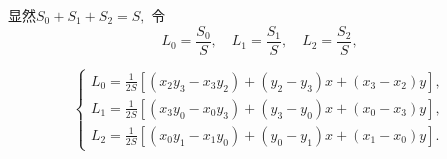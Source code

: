 \documentclass[a4paper,UTF8,titlepage,10pt]{ctexart}
\numberwithin{equation}{subsection}
\begin{document}

\begin{figure}[h]
	\centering
	\caption{}
	\label{xxy}
\end{figure}

显然$S_0 + S_1 + S_2 = S,$ 令
\begin{equation}
L_0 = \frac{S_0}{S}, \quad L_1 = \frac{S_1}{S}, \quad L_2 = \frac{S_2}{S} ,
\end{equation}
\par

$$
\begin{cases}
	L_0 = \frac{1}{2S} [(x_2 y_3 - x_3 y_2) + (y_2 - y_3) x + (x_3 - x_2) y], \\
	L_1 = \frac{1}{2S} [(x_3 y_0 - x_0 y_3) + (y_3 - y_0) x + (x_0 - x_3) y], \\
	L_2 = \frac{1}{2S} [(x_0 y_1 - x_1 y_0) + (y_0 - y_1) x + (x_1 - x_0) y]. 
\end{cases} 
$$
\end{document}
